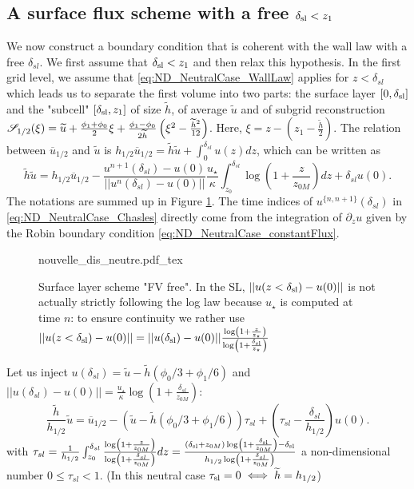 \subsection{A surface flux scheme with a free $\delta_{\rm sl}<z_1$}
We now construct a boundary condition that is coherent
with the wall law with a free $\delta_{sl}$. We first assume
that $\delta_{\rm sl} < z_1$ and then relax this hypothesis.
In the first grid level, we assume that
\eqref{eq:ND_NeutralCase_WallLaw} applies for $z<\delta_{sl}$
which leads us to separate the 
first volume into two parts: the surface layer $[0,\delta_{\rm sl}]$ and the "subcell" $[\delta_{\rm sl}, z_1]$ of size $\widetilde{h}$, of average $\widetilde{u}$
and of subgrid reconstruction
${\cal S}_{1/2}(\xi) = \widetilde{u} + \frac{\phi_{1} + \phi_{0}}{2} \xi
+ \frac{\phi_{1} - \phi_{0}}{2\widetilde{h}}\left(\xi^2 - \frac{\widetilde{h}^2}{12}\right)
$.
Here, $\xi = z - (z_1 - \frac{\widetilde{h}}{2})$.
The relation between $\overline{u}_{1/2}$ and $\widetilde{u}$ is 
$ h_{1/2}\overline{u}_{1/2} = \widetilde{h}\widetilde{u}
+ \int_0^{\delta_{sl}}u(z)dz$, which can be written as
\begin{equation}
\label{eq:ND_NeutralCase_Chasles}
	\widetilde{h}\widetilde{u} = h_{1/2}\overline{u}_{1/2} - \frac{u^{n+1}(\delta_{sl})-u(0)}{||u^n(\delta_{sl})-u(0)||}\frac{{u_\star}}{\kappa}\int_{z_0}^{\delta_{sl}} \log(1+\frac{z}{z_{0M}}) dz
	+ \delta_{sl} u(0) .
\end{equation}
The notations are summed up in Figure
\ref{fig:ND_NeutralCase_nouvelle_dis_neutre}.
The time indices of $u^{\{n, n+1\}}(\delta_{sl})$
in \eqref{eq:ND_NeutralCase_Chasles} directly come from the integration 
of $\partial_z u$ given by the Robin boundary
condition \eqref{eq:ND_NeutralCase_constantFlux}.
\begin{figure}
	{nouvelle_dis_neutre.pdf_tex}
	\caption{ Surface layer scheme "FV free".
	In the SL, $||u(z<\delta_{\rm sl})-u(0)||$ is not
	actually strictly following the log law because
	$u_\star$ is computed at time $n$: to ensure continuity
	we rather use
	$||u(z<\delta_{\rm sl})-u(0)|| = 
	||u(\delta_{\rm sl})-u(0)|| \frac{\log(
	1+\frac{z}{z_\star})}{\log(1+\frac{\delta_{\rm sl}}{z_\star})}$
	}
	\label{fig:ND_NeutralCase_nouvelle_dis_neutre}
\end{figure}
\par
Let us inject $u(\delta_{sl}) = \widetilde{u} - \widetilde{h}(\phi_0/3 + \phi_1/6)$ and $||u(\delta_{sl})-u(0)|| = \frac{{u_\star}}{\kappa}\log(1+\frac{\delta_{sl}}{z_{0M}})$:
\begin{equation}
	\frac{\widetilde{h}}{h_{1/2}}\widetilde{u} = \overline{u}_{1/2} - \left(\widetilde{u} - \widetilde{h}(\phi_0/3 + \phi_1/6)
	\right)\tau_{sl} +
	(\tau_{sl} - \frac{\delta_{sl}}{h_{1/2}})u(0).
\end{equation}
with $\tau_{sl} = \frac{1}{{h_{1/2}}}\int_{z_0}^{\delta_{sl}} \frac{\log(1+\frac{z}{z_{0M}})}{\log(1+\frac{\delta_{sl}}{z_{0M}})} dz =
\frac{(\delta_{\rm sl} + z_{0M})\log(1+\frac{\delta_{\rm sl}}{z_{0M}}) - \delta_{\rm sl}}{h_{1/2}\log(1+\frac{\delta_{sl}}{z_{0M}})}$ a non-dimensional number $0 \leq\tau_{sl} < 1$. (In this neutral case $\tau_{\rm sl} = 0 \iff \widetilde{h}=h_{1/2}$)

